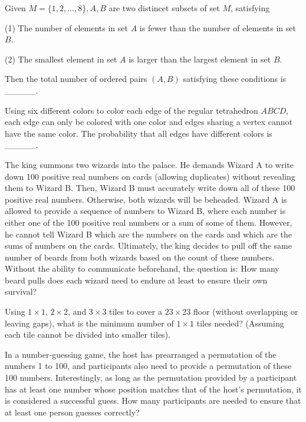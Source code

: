 \begin{problem}\label{Combinary-5}
Given $M=\{1,2, \ldots, 8\}, A, B$ are two distincet subsets of set $M$, satisfying

(1) The number of elements in set \(A\) is fewer than the number of elements in set \(B\).

(2) The smallest element in set \(A\) is larger than the largest element in set \(B\).

Then the total number of ordered pairs \((A, B)\) satisfying these conditions is \_\_\_\_\_.

\end{problem}


\begin{problem}\label{Combinary-6}
Using six different colors to color each edge of the regular tetrahedron \(ABCD\), each edge can only be colored with one color and edges sharing a vertex cannot have the same color. The probability that all edges have different colors is \_\_\_\_\_.
\end{problem}


\begin{problem}\label{Combinary-7}
 The king summons two wizards into the palace. He demands Wizard A to write down 100 positive real numbers on cards (allowing duplicates) without revealing them to Wizard B. Then, Wizard B must accurately write down all of these 100 positive real numbers. Otherwise, both wizards will be beheaded. Wizard A is allowed to provide a sequence of numbers to Wizard B, where each number is either one of the 100 positive real numbers or a sum of some of them. However, he cannot tell Wizard B which are the numbers on the cards and which are the sums of numbers on the cards. Ultimately, the king decides to pull off the same number of beards from both wizards based on the count of these numbers. Without the ability to communicate beforehand, the question is: How many beard pulls does each wizard need to endure at least to ensure their own survival?
\end{problem}


\begin{problem}\label{Combinary-8}
Using $1 \times 1$, $2 \times 2$, and $3 \times 3$ tiles to cover a $23 \times 23$ floor (without overlapping or leaving gaps), what is the minimum number of $1 \times 1$ tiles needed? (Assuming each tile cannot be divided into smaller tiles).
\end{problem}


\begin{problem}\label{Combinary-9}
 In a number-guessing game, the host has prearranged a permutation of the numbers 1 to 100, and participants also need to provide a permutation of these 100 numbers. Interestingly, as long as the permutation provided by a participant has at least one number whose position matches that of the host's permutation, it is considered a successful guess. How many participants are needed to ensure that at least one person guesses correctly?
\end{problem}


